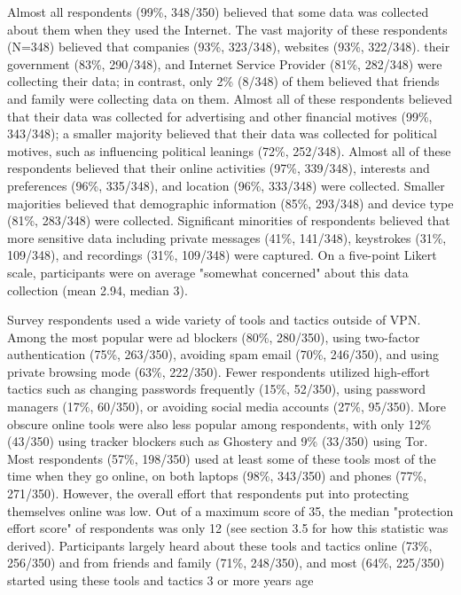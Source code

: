 Almost all respondents (99\%, 348/350) believed that some data was collected
about them when they used the Internet. The vast majority of these respondents
(N=348) believed that companies (93\%, 323/348), websites (93\%, 322/348).
their government (83\%, 290/348), and Internet Service Provider (81\%,
282/348) were collecting their data; in contrast, only 2\% (8/348) of them
believed that friends and family were collecting data on them. Almost all of
these respondents believed that their data was collected for advertising and
other financial motives (99\%, 343/348); a smaller majority believed that
their data was collected for political motives, such as influencing political
leanings (72\%, 252/348). Almost all of these respondents believed that their
online activities (97\%, 339/348), interests and preferences (96\%, 335/348),
and location (96\%, 333/348) were collected. Smaller majorities believed that
demographic information (85\%, 293/348) and device type (81\%, 283/348) were
collected. Significant minorities of respondents believed that more sensitive
data including private messages (41\%, 141/348), keystrokes (31\%, 109/348),
and recordings (31\%, 109/348) were captured. On a five-point Likert scale,
participants were on average "somewhat concerned" about this data collection
(mean 2.94, median 3).

Survey respondents used a wide variety of tools and tactics outside of VPN.
Among the most popular were ad blockers (80\%, 280/350), using two-factor
authentication (75\%, 263/350), avoiding spam email (70\%, 246/350), and using
private browsing mode (63\%, 222/350). Fewer respondents utilized high-effort
tactics such as changing passwords frequently (15\%, 52/350), using password
managers (17\%, 60/350), or avoiding social media accounts (27\%, 95/350).
More obscure online tools were also less popular among respondents, with only
12\% (43/350) using tracker blockers such as Ghostery and 9\% (33/350) using
Tor. Most respondents (57\%, 198/350) used at least some of these tools most
of the time when they go online, on both laptops (98\%, 343/350) and phones
(77\%, 271/350). However, the overall effort that respondents put into
protecting themselves online was low. Out of a maximum score of 35, the median
"protection effort score" of respondents was only 12 (see section 3.5 for how
this statistic was derived). Participants largely heard about these tools and
tactics online (73\%, 256/350) and from friends and family (71\%, 248/350),
and most (64\%, 225/350) started using these tools and tactics 3 or more years
age


